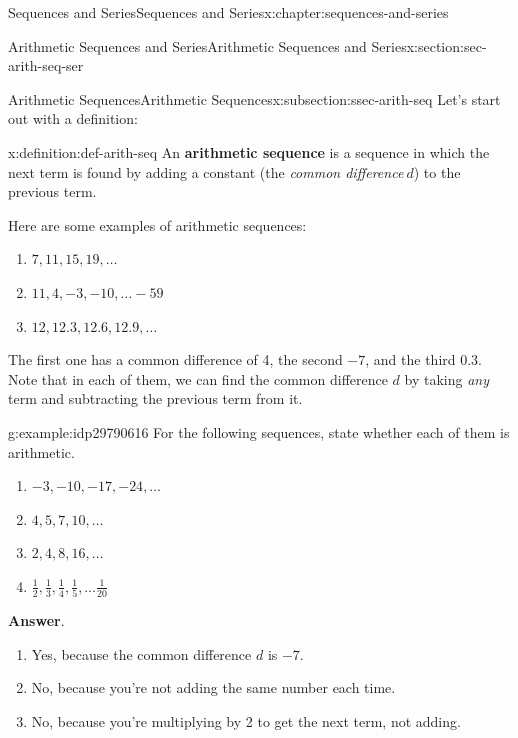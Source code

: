 \documentclass[twoside,10pt,]{book}
\newcommand{\blocktitlefont}{\relax}
\newcommand{\terminology}[1]{\textbf{#1}}
\numberwithin{equation}{section}
\begin{document}
\begin{chapterptx}{Sequences and Series}{}{Sequences and Series}{}{}{x:chapter:sequences-and-series}
\begin{sectionptx}{Arithmetic Sequences and Series}{}{Arithmetic Sequences and Series}{}{}{x:section:sec-arith-seq-ser}
%
%
\typeout{************************************************}
\typeout{************************************************}
%
\begin{subsectionptx}{Arithmetic Sequences}{}{Arithmetic Sequences}{}{}{x:subsection:ssec-arith-seq}
Let's start out with a definition: \begin{definition}{}{x:definition:def-arith-seq}%
An \terminology{arithmetic sequence} is a sequence in which the next term is found by adding a constant (the \emph{common difference}\(\ d\)) to the previous term.\end{definition}
%
\par
Here are some examples of arithmetic sequences:%
\begin{enumerate}[label=(\alph*)]
\item{}\(\displaystyle 7, 11, 15, 19, \ldots \)%
\item{}\(\displaystyle 11, 4, -3, -10, \ldots -59\)%
\item{}\(\displaystyle 12, 12.3, 12.6, 12.9, \ldots\)%
\end{enumerate}
The first one has a common difference of 4, the second \(-7\), and the third 0.3.  Note that in each of them, we can find the common difference \(d\) by taking \emph{any} term and subtracting the previous term from it. \begin{example}{}{g:example:idp29790616}%
For the following sequences, state whether each of them is arithmetic. %
\begin{enumerate}[label=(\alph*)]
\item{}\(\displaystyle -3, -10, -17, -24, \ldots\)%
\item{}\(\displaystyle 4, 5, 7, 10, \ldots\)%
\item{}\(\displaystyle 2, 4, 8, 16, \ldots\)%
\item{}\(\displaystyle \frac{1}{2},\frac{1}{3},\frac{1}{4},\frac{1}{5},\ldots \frac{1}{20}\)%
\end{enumerate}
\par\smallskip%
\noindent\textbf{\blocktitlefont Answer}.\label{g:answer:idp29788824}{}\hypertarget{g:answer:idp29788824}{}\quad{}%
\begin{enumerate}[label=(\alph*)]
\item{}Yes, because the common difference \(d\) is \(-7\).%
\item{}No, because you're not adding the same number each time.%
\item{}No, because you're multiplying by 2 to get the next term, not adding.%

\end{enumerate}
\end{example}
\end{subsectionptx}
\end{sectionptx}
\end{chapterptx}
\end{document}
